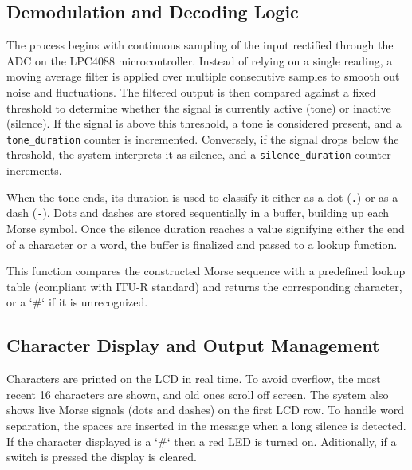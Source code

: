 \documentclass{article}
\begin{document}
\subsection{Demodulation and Decoding Logic} 
The process begins with continuous sampling of the input rectified through the ADC on the 
LPC4088 microcontroller. Instead of relying on a single reading,
 a moving average filter is applied over multiple consecutive samples to smooth out noise and 
 fluctuations.
 The filtered output is then compared against a fixed threshold to determine 
whether the signal is currently active (tone) or inactive (silence).
 If the signal is above this threshold, a tone is considered present, and a \texttt{tone\_duration}
  counter is incremented. Conversely, if the signal drops below the threshold, the system interprets 
  it as silence, and a \texttt{silence\_duration} counter increments. 

When the tone ends, its duration is used to classify it either as a dot (\texttt{.}) 
or as a dash (\texttt{-}). Dots and dashes are stored sequentially in a buffer, 
building up each Morse symbol. Once the silence duration reaches a value signifying 
either the end of a character or a word, the buffer is finalized and passed to a lookup function.

This function compares the constructed Morse sequence with a predefined lookup table
(compliant with ITU-R standard) and returns the corresponding character, or a `\#` if it is unrecognized. 

\subsection{Character Display and Output Management}
Characters are printed on the LCD in real time. To avoid overflow, 
the most recent 16 characters are shown, and old ones scroll off screen. 
The system also shows live Morse signals (dots and dashes) on the first LCD row.
To handle word separation, the spaces are inserted in the message when a long silence is detected. 
If the character displayed is a `\#` then a red LED is turned on. Aditionally, if a switch is pressed 
the display is cleared.  
\end{document}
